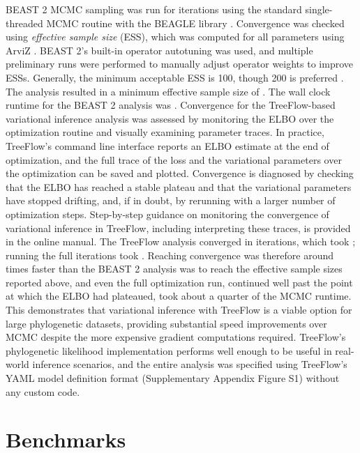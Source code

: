 BEAST 2 MCMC sampling was run for  iterations using the standard single-threaded MCMC routine with the BEAGLE library \cite{ayres2019beagle}. Convergence was checked using \textit{effective sample size} (ESS), which was computed for all parameters using ArviZ \cite{kumar2019arviz}. BEAST 2's built-in operator autotuning was used, and multiple preliminary runs were performed to manually adjust operator weights to improve ESSs. Generally, the minimum acceptable ESS is 100, though 200 is preferred \cite{drummond2015bayesian}. The analysis resulted in a minimum effective sample size of . The wall clock runtime for the BEAST 2 analysis was . Convergence for the TreeFlow-based variational inference analysis was assessed by monitoring the ELBO over the optimization routine and visually examining parameter traces. In practice, TreeFlow's command line interface reports an ELBO estimate at the end of optimization, and the full trace of the loss and the variational parameters over the optimization can be saved and plotted. Convergence is diagnosed by checking that the ELBO has reached a stable plateau and that the variational parameters have stopped drifting, and, if in doubt, by rerunning with a larger number of optimization steps. Step-by-step guidance on monitoring the convergence of variational inference in TreeFlow, including interpreting these traces, is provided in the online manual. The TreeFlow analysis converged in  iterations, which took ; running the full  iterations took . Reaching convergence was therefore around  times faster than the BEAST 2 analysis was to reach the effective sample sizes reported above, and even the full optimization run, continued well past the point at which the ELBO had plateaued, took about a quarter of the MCMC runtime. This demonstrates that variational inference with TreeFlow is a viable option for large phylogenetic datasets, providing substantial speed improvements over MCMC despite the more expensive gradient computations required. TreeFlow's phylogenetic likelihood implementation performs well enough to be useful in real-world inference scenarios, and the entire analysis was specified using TreeFlow's YAML model definition format (Supplementary Appendix Figure S1) without any custom code.

\section{Benchmarks}
\label{benchmarks}

